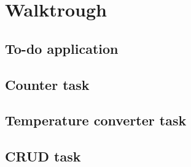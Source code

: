 \chapter{Walktrough}
\label{chap:walktrough}

\section{To-do application}
\section{Counter task}
\section{Temperature converter task}
\section{CRUD task}

